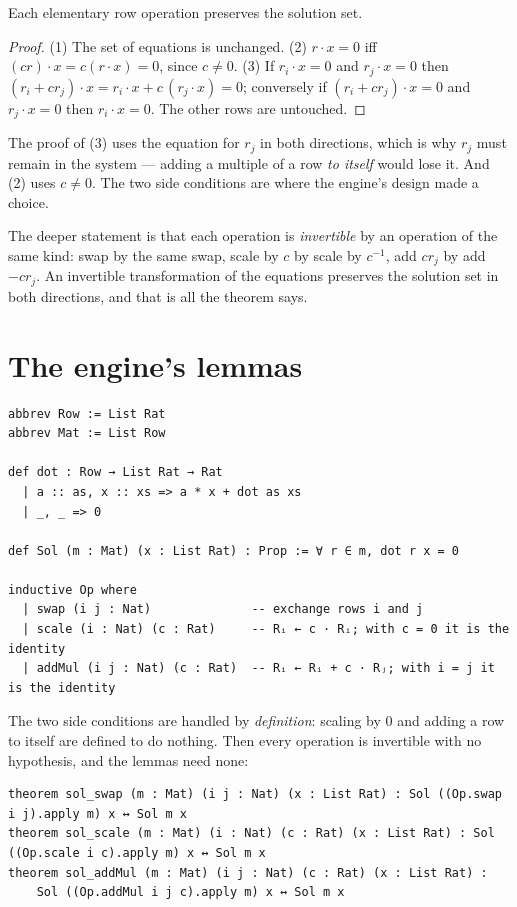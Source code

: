 \begin{theorem}
  Each elementary row operation preserves the solution set.
\end{theorem}
\begin{proof}
  (1) The set of equations is unchanged. (2) $r \cdot x = 0$ iff $(cr) \cdot x = c(r \cdot x) = 0$,
  since $c \neq 0$. (3) If $r_i \cdot x = 0$ and $r_j \cdot x = 0$ then
  $(r_i + c r_j) \cdot x = r_i \cdot x + c\,(r_j \cdot x) = 0$; conversely if $(r_i + cr_j)\cdot x = 0$
  and $r_j \cdot x = 0$ then $r_i \cdot x = 0$. The other rows are untouched.
\end{proof}

The proof of (3) uses the equation for $r_j$ in both directions, which is why $r_j$ must remain in
the system --- adding a multiple of a row \emph{to itself} would lose it. And (2) uses $c \neq 0$.
The two side conditions are where the engine's design made a choice.

The deeper statement is that each operation is \emph{invertible} by an operation of the same
kind: swap by the same swap, scale by $c$ by scale by $c^{-1}$, add $c r_j$ by add $-c r_j$. An
invertible transformation of the equations preserves the solution set in both directions, and
that is all the theorem says.

\section{The engine's lemmas}

\begin{verbatim}
abbrev Row := List Rat
abbrev Mat := List Row

def dot : Row → List Rat → Rat
  | a :: as, x :: xs => a * x + dot as xs
  | _, _ => 0

def Sol (m : Mat) (x : List Rat) : Prop := ∀ r ∈ m, dot r x = 0

inductive Op where
  | swap (i j : Nat)              -- exchange rows i and j
  | scale (i : Nat) (c : Rat)     -- Rᵢ ← c · Rᵢ; with c = 0 it is the identity
  | addMul (i j : Nat) (c : Rat)  -- Rᵢ ← Rᵢ + c · Rⱼ; with i = j it is the identity
\end{verbatim}

The two side conditions are handled by \emph{definition}: scaling by $0$ and adding a row to
itself are defined to do nothing. Then every operation is invertible with no hypothesis, and the
lemmas need none:

\begin{verbatim}
theorem sol_swap (m : Mat) (i j : Nat) (x : List Rat) : Sol ((Op.swap i j).apply m) x ↔ Sol m x
theorem sol_scale (m : Mat) (i : Nat) (c : Rat) (x : List Rat) : Sol ((Op.scale i c).apply m) x ↔ Sol m x
theorem sol_addMul (m : Mat) (i j : Nat) (c : Rat) (x : List Rat) :
    Sol ((Op.addMul i j c).apply m) x ↔ Sol m x
\end{verbatim}

